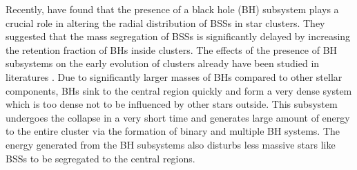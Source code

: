\documentclass[useAMS,usenatbib,twocolumn]{mnras}
\begin{document}

Recently, \citet{2016ApJ...833..252A} have found that the presence of a black hole (BH) subsystem plays a crucial role in altering the radial distribution of BSSs in star clusters. They suggested that the mass segregation of BSSs is significantly delayed by increasing the retention fraction of BHs inside clusters. The effects of the presence of BH subsystems on the early evolution of clusters already have been studied in literatures \citep[e.g.][]{1993Natur.364..423S,1993Natur.364..421K,2013MNRAS.432.2779B}. Due to significantly larger masses of BHs compared to other stellar components, BHs sink to the central region quickly and form a very dense system which is too dense not to be influenced by other stars outside. This subsystem undergoes the collapse in a very short time and generates large amount of energy to the entire cluster via the formation of binary and multiple BH systems. The energy generated from the BH subsystems also disturbs less massive stars like BSSs to be segregated to the central regions.
\end{document}
